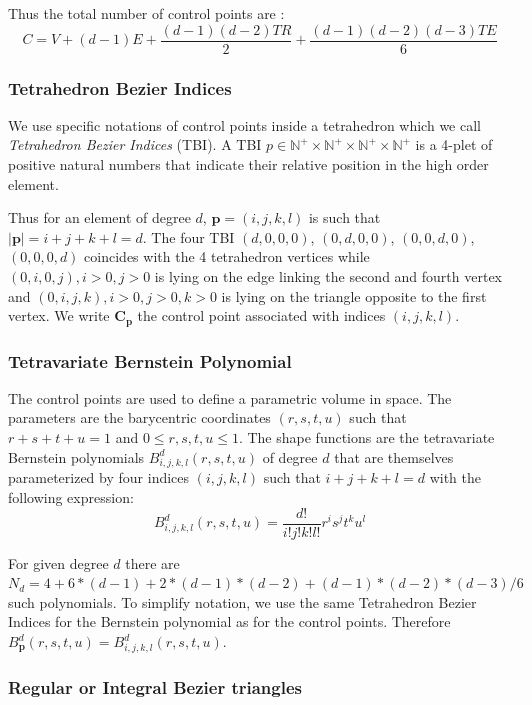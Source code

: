 \documentclass[a4paper,11pt]{article}
\newcommand{\nvertices}{{ V}}
\newcommand{\nedges}{{ E}}
\newcommand{\ntriangles}{{ TR}}
\newcommand{\ntetrahedra}{{ TE}}
\newcommand{\ncontrols}{{C}}
\newcommand{\control}{{\mathbf C}}
\newcommand{\degree}{{d}}
\newcommand{\naturalSet}{{\mathbb N}}
\begin{document}
Thus the total number of control points are :
\[
\ncontrols=\nvertices+(\degree-1) \nedges+\frac{(\degree-1) (\degree-2) \ntriangles}{2}+\frac{(\degree-1) (\degree-2) (\degree-3) \ntetrahedra}{6}
\]
\subsubsection{Tetrahedron Bezier Indices}

We use specific notations of control points inside a tetrahedron which we call {\em Tetrahedron Bezier Indices} (TBI).
A TBI $p\in \naturalSet^{+}\times\naturalSet^{+}\times\naturalSet^{+}\times\naturalSet^{+}$ is a 4-plet of positive natural numbers that indicate their relative position in the high order element. 

Thus for an element of degree $\degree$, ${\mathbf p}=(i,j,k,l)$ is such that $|{\mathbf p}|=i+j+k+l=\degree$.  The four TBI $(\degree,0,0,0)$, $(0,\degree,0,0)$, $(0,0,\degree,0)$, $(0,0,0,\degree)$ coincides with the 4 tetrahedron vertices while $(0,i,0,j), i>0, j>0$ is lying on the edge linking the second and fourth vertex and   $(0,i,j,k), i>0, j>0, k>0$ is lying on the triangle opposite to the first vertex. We write $\control_{\mathbf p}$ the control point associated with indices $(i,j,k,l)$.

\subsubsection{Tetravariate Bernstein Polynomial}

The control points are used to define a parametric volume in space. The parameters are the barycentric coordinates $(r,s,t,u)$ such that $r+s+t+u=1$ and $0\leq r,s,t,u \leq 1$. The shape functions are the tetravariate Bernstein polynomials $B^d_{i,j,k,l}(r,s,t,u)$ of degree $d$ that are themselves parameterized by four indices $(i,j,k,l)$ such that $i+j+k+l=d$ with the following expression:
\[
B^\degree_{i,j,k,l}(r,s,t,u)=\frac{\degree!}{i! j! k! l!} r^i s^j t^k u ^l
\]

For given degree $d$ there are $N_d=4+6*(\degree-1)+2*(\degree-1)*(\degree-2)+(\degree-1)*(\degree-2)*(\degree-3)/6$ such polynomials. To simplify notation, we use the same Tetrahedron Bezier Indices for the Bernstein polynomial as for the control points. Therefore $B^d_{\mathbf p}(r,s,t,u)=B^d_{i,j,k,l}(r,s,t,u)$.


\subsubsection{Regular or Integral Bezier triangles}
\end{document}
